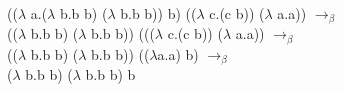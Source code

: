 \documentclass[24pt]{article}
\begin{document}
(($\lambda$ a.($\lambda$ b.b b) ($\lambda$ b.b b)) b) (($\lambda$ c.(c b)) ($\lambda$ a.a)) 
$\to_\beta$\\
(($\lambda$ b.b b) ($\lambda$ b.b b)) ((($\lambda$ c.(c b)) ($\lambda$ a.a))
$\to_\beta$\\
(($\lambda$ b.b b) ($\lambda$ b.b b)) (($\lambda$a.a) b)
$\to_\beta$\\
($\lambda$ b.b b) ($\lambda$ b.b b) b
\end{document}
